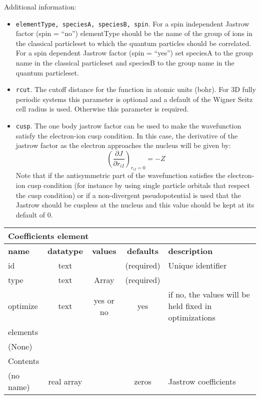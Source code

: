 Additional information:

 \begin{itemize}
 \item \texttt{elementType, speciesA, speciesB, spin}.  For a spin independent Jastrow factor (spin = ``no'')
elementType should be the name of the group of ions in the classical particleset to which the quantum
particles should be correlated.  For a spin dependent Jastrow factor (spin = ``yes'') set speciesA to the
group name in the classical particleset and speciesB to the group name in the quantum particleset.
 \item \texttt{rcut}. The cutoff distance for the function in atomic units (bohr). 
For 3D fully periodic systems this parameter is optional and a default of the Wigner 
Seitz cell radius is used. Otherwise this parameter is required.
 \item \texttt{cusp}. The one body jastrow factor can be used to make the wavefunction
satisfy the electron-ion cusp condition\cite{kato}.  In this case, the derivative of the jastrow
factor as the electron approaches the nucleus will be given by:
\begin{equation}
\left(\frac{\partial J}{\partial r_{iI}}\right)_{r_{iI} = 0} = -Z
\end{equation}
Note that if the antisymmetric part of the wavefunction satisfies the electron-ion cusp
condition (for instance by using single particle orbitals that respect the cusp condition)
or if a non-divergent pseudopotential is used that the Jastrow should be cuspless at the 
nucleus and this value should be kept at its default of 0.
 \end{itemize}


\begin{table}[h]
\begin{center}
\begin{tabular}{l c c c l }
\hline
\multicolumn{5}{l}{Coefficients element} \\
\hline
\bfseries name & \bfseries datatype & \bfseries values & \bfseries defaults & \bfseries description \\
\hline
id & text & & (required) & Unique identifier \\
type & text & Array & (required) & \\
optimize & text & yes or no & yes & if no, the values will be held fixed in optimizations \\
\hline
\multicolumn{5}{l}{elements}\\ \hline
(None) & & & \\ \hline
\multicolumn{5}{l}{Contents}\\ \hline
 (no name) & real array & & zeros & Jastrow coefficients \\ \hline
\end{tabular}
\end{center}
\end{table}



